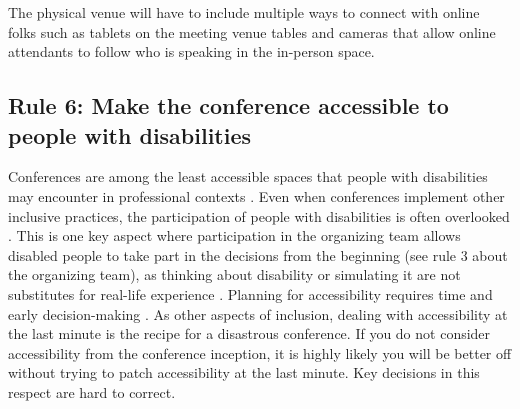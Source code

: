 \documentclass[10pt,letterpaper]{article}
\begin{document}
  The physical venue will have to include multiple ways to connect with online folks such as tablets on the meeting venue tables and cameras that allow online attendants to follow who is speaking in the in-person space. 



\subsection*{Rule 6: Make the conference accessible to people with disabilities}
\label{rule_accessibility}

Conferences are among the least accessible spaces that people with disabilities may encounter in professional contexts \cite{priceAccessImaginedConstruction2009}. Even when conferences implement other inclusive practices, the participation of people with disabilities is often overlooked \cite{marks2021meeting}. This is one key aspect where participation in the organizing team allows disabled people to take part in the decisions from the beginning (see rule 3 about the organizing team), as thinking about disability or simulating it are not substitutes for real-life experience \cite{costanzachockDesign2020}. Planning for accessibility requires time and early decision-making \cite{irishIncreasingParticipationUsing2020}. As other aspects of inclusion, dealing with accessibility at the last minute is the recipe for a disastrous conference. If you do not consider accessibility from the conference inception, it is highly likely you will be better off without trying to patch accessibility at the last minute. Key decisions in this respect are hard to correct.
\end{document}
